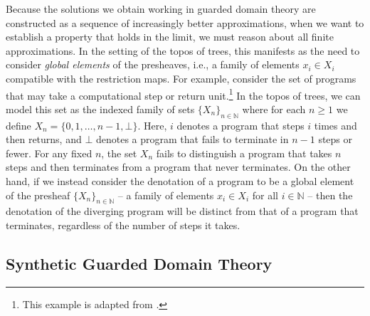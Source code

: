 Because the solutions we obtain working in guarded domain theory are constructed
as a sequence of increasingly better approximations, when we want to establish a
property that holds in the limit, we must reason about all finite
approximations. In the setting of the topos of trees, this manifests as the need
to consider \emph{global elements} of the presheaves, i.e., a family of elements
$x_i \in X_i$ compatible with the restriction maps. For example, consider the
set of programs that may take a computational step or return unit.\footnote{This example is adapted from \cite{mogelberg-paviotti2016}.} In the
topos of trees, we can model this set as the indexed family of sets $\{X_n\}_{n \in \mathbb{N}}$
where for each $n \ge 1$ we define $X_n = \{0,1,\dots,n-1, \bot\}$. Here, $i$ denotes a program that steps
$i$ times and then returns, and $\bot$ denotes a program that fails to terminate
in $n-1$ steps or fewer. For any fixed $n$, the set $X_n$ fails to distinguish a
program that takes $n$ steps and then terminates from a program that never
terminates. On the other hand, if we instead consider the denotation of a
program to be a global element of the presheaf $\{X_n\}_{n \in \mathbb{N}}$ -- a family of elements
$x_i \in X_i$ for all $i \in \mathbb{N}$ -- then the denotation of the diverging
program will be distinct from that of a program that terminates, regardless of
the number of steps it takes.



\subsection{Synthetic Guarded Domain Theory}

